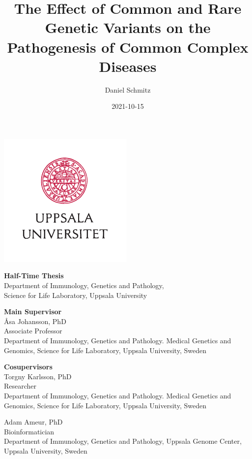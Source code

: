 \documentclass[]{scrbook}
\title{The Effect of Common and Rare Genetic Variants on the Pathogenesis of Common Complex Diseases}
\author{Daniel Schmitz}
\date{2021-10-15}
\begin{document}
\frontmatter
\newlength{\oldparindent}
\setlength{\oldparindent}{\parindent}

\parskip 6pt
\parindent 0pt

\begin{titlepage}
    \centering
    \makeatletter
    \LARGE \sffamily \@title

    \Large \rmfamily \@author

    \vspace*{\fill}
    \includegraphics[width=.5\pagewidth]{img/UU_logo_4f_42.pdf}

    \vspace*{\fill}
    \normalsize
    \textbf{Half-Time Thesis} \\
    Department of Immunology, Genetics and Pathology,\\
    Science for Life Laboratory, Uppsala University

    \@date
    \makeatother
\end{titlepage}

\textbf{Main Supervisor}\\
Åsa Johansson, PhD\\
Associate Professor \\
Department of Immunology, Genetics and Pathology. Medical Genetics and Genomics, Science for Life Laboratory, Uppsala University, Sweden

\textbf{Cosupervisors}\\
Torgny Karlsson, PhD\\
Researcher \\
Department of Immunology, Genetics and Pathology. Medical Genetics and Genomics, Science for Life Laboratory, Uppsala University, Sweden

Adam Ameur, PhD \\
Bioinformatician \\
Department of Immunology, Genetics and Pathology, Uppsala Genome Center, Uppsala University, Sweden
\end{document}
